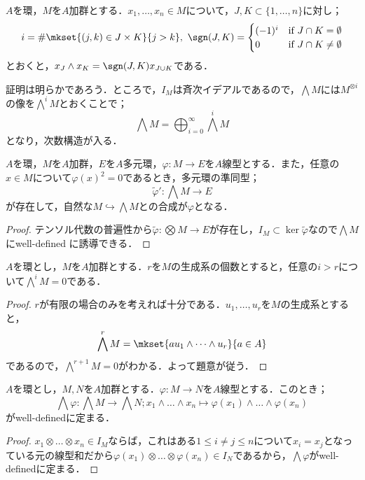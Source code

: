 \begin{prop}
	$A$を環，$M$を$A$加群とする．$x_1,\dots,x_n\in M$について，$J,K\subset\{1,\dots,n\}$に対し；
	\[i=\#\mkset{(j,k)\in J\times K}{j>k},~\sgn(J,K)=
	\begin{cases}
	(-1)^i&\text{if}~J\cap K=\emptyset\\
	0&\text{if}~J\cap K\neq\emptyset
	\end{cases}\]
	とおくと，$x_J\wedge x_K=\sgn(J,K)x_{J\cup K}$である．
\end{prop}

証明は明らかであろう．ところで，$I_M$は斉次イデアルであるので，$\bigwedge M$には$M^{\otimes i}$の像を$\bigwedge^i M$とおくことで；
\[\bigwedge M=\bigoplus_{i=0}^\infty \bigwedge^i M\]
となり，次数構造が入る．

\begin{prop}[外積代数の普遍性]\label{prop:外積代数の普遍性}
	$A$を環，$M$を$A$加群，$E$を$A$多元環，$\varphi:M\to E$を$A$線型とする．また，任意の$x\in M$について$\varphi(x)^2=0$であるとき，多元環の準同型；
	\[{\widetilde\varphi}':\bigwedge M\to E\]
	が存在して，自然な$M\hookrightarrow\bigwedge M$との合成が$\varphi$となる．
\end{prop}

\begin{proof}
	テンソル代数の普遍性から$\widetilde\varphi:\bigotimes M\to E$が存在し，$I_M\subset\ker\widetilde\varphi$なので$\bigwedge M$にwell-defined に誘導できる．
\end{proof}

\begin{prop}\label{prop:有限生成加群の外積代数}
	$A$を環とし，$M$を$A$加群とする．$r$を$M$の生成系の個数とすると，任意の$i>r$について$\bigwedge^i M=0$である．
\end{prop}

\begin{proof}
	$r$が有限の場合のみを考えれば十分である．$u_1,\dots,u_r$を$M$の生成系とすると，
	\[\bigwedge^r M=\mkset{au_1\wedge\dots\wedge u_r}{a\in A}\]
	であるので，$\bigwedge^{r+1}M=0$がわかる．よって題意が従う．
\end{proof}

\begin{prop}
	$A$を環とし，$M,N$を$A$加群とする．$\varphi:M\to N$を$A$線型とする．このとき；
	\[\bigwedge\varphi:\bigwedge M\to\bigwedge N;x_1\wedge\dots\wedge x_n\mapsto\varphi(x_1)\wedge\dots\wedge\varphi(x_n)\]
	がwell-definedに定まる．
\end{prop}

\begin{proof}
	$x_1\otimes\dots\otimes x_n\in I_M$ならば，これはある$1\leq i\neq j\leq n$について$x_i=x_j$となっている元の線型和だから$\varphi(x_1)\otimes\dots\otimes\varphi(x_n)\in I_N$であるから，$\bigwedge\varphi$がwell-definedに定まる．
\end{proof}

